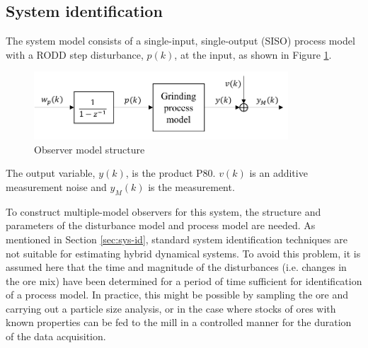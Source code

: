 \subsection{System identification} \label{sec:grind1-sysid}

The system model consists of a single-input, single-output (SISO) process model with a \gls{RODD} step disturbance, $p(k)$, at the input, as shown in Figure \ref{fig:grind1_obs_model}.
\begin{figure}[ht]
	\centering
	\includegraphics[width=9.5cm]{images/grind1-obs-model-diag.pdf}
	\caption{Observer model structure}
	\label{fig:grind1_obs_model}
\end{figure}
The output variable, $y(k)$, is the product P80. $v(k)$ is an additive measurement noise and $y_M(k)$ is the measurement.

To construct multiple-model observers for this system, the structure and parameters of the disturbance model and process model are needed. As mentioned in Section \ref{sec:sys-id}, standard system identification techniques are not suitable for estimating hybrid dynamical systems. To avoid this problem, it is assumed here that the time and magnitude of the disturbances (i.e. changes in the ore mix) have been determined for a period of time sufficient for identification of a process model. In practice, this might be possible by sampling the ore and carrying out a particle size analysis, or in the case where stocks of ores with known properties can be fed to the mill in a controlled manner for the duration of the data acquisition.

